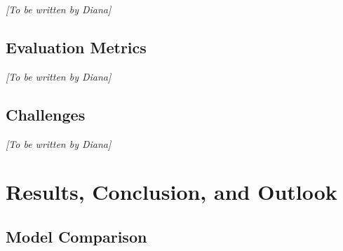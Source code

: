\documentclass[11pt,a4paper]{article}
\begin{document}
\textit{[To be written by Diana]}

\subsection{Evaluation Metrics}

\textit{[To be written by Diana]}

\subsection{Challenges}

\textit{[To be written by Diana]}

\section{Results, Conclusion, and Outlook}
\label{sec:results}


\subsection{Model Comparison}
%
%
\end{document}
